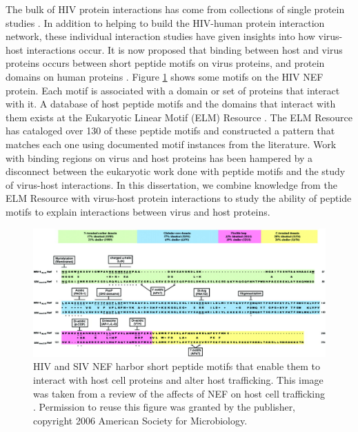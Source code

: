 The bulk of HIV protein interactions has come from collections of
single protein studies \cite{mendez2010global, chatr08, ptak08,
  driscoll2009pig}. In addition to helping to build the HIV-human
protein interaction network, these individual interaction studies have
given insights into how virus-host interactions occur. It is now
proposed that binding between host and virus proteins occurs between
short peptide motifs on virus proteins, and protein domains on human
proteins \cite{tonikian08,shelton08,kadaveru08}. Figure
\ref{fig:intro:nef} shows some motifs on the HIV NEF protein. Each
motif is associated with a domain or set of proteins that interact
with it. A database of host peptide motifs and the domains that
interact with them exists at the Eukaryotic Linear Motif (ELM)
Resource \cite{puntervoll03}. The ELM Resource has cataloged over 130
of these peptide motifs and constructed a pattern that matches each
one using documented motif instances from the literature.  Work with
binding regions on virus and host proteins has been hampered by a
disconnect between the eukaryotic work done with peptide motifs and
the study of virus-host interactions. In this dissertation, we combine
knowledge from the ELM Resource with virus-host protein interactions
to study the ability of peptide motifs to explain interactions between
virus and host proteins.

\begin{figure}
\begin{center}
\includegraphics[scale=0.25]{figs/intro_nef}
\end{center}
\caption[Host peptide motifs on HIV NEF]{\small HIV and SIV NEF harbor
  short peptide motifs that enable them to interact with host cell
  proteins and alter host trafficking. This image was taken from a
  review of the affects of NEF on host cell trafficking
  \cite{roeth06}. Permission to reuse this figure was granted by the
  publisher, copyright 2006 American Society for
  Microbiology. \label{fig:intro:nef}}
\end{figure}

